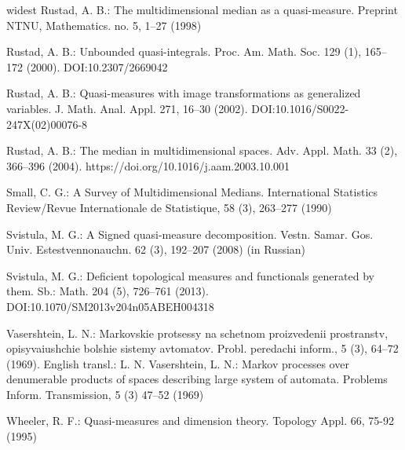 \documentclass[sn-mathphys-num]{sn-jnl}%
\theoremstyle{thmstyleone}%
\theoremstyle{definition}
\begin{document}
\begin{thebibliography}{widest}
 Rustad, A. B.: The multidimensional median as a quasi-measure. Preprint NTNU, Mathematics. no. 5, 1--27 (1998)

 Rustad, A. B.: Unbounded quasi-integrals. Proc. Am. Math. Soc. 129 (1), 165--172 (2000). DOI:10.2307/2669042   

 Rustad, A. B.:  Quasi-measures with image transformations as generalized variables. J. Math. Anal. Appl. 271, 16--30 (2002). 
 DOI:10.1016/S0022-247X(02)00076-8 

  Rustad, A. B.:  The median in multidimensional spaces. Adv.  Appl. Math. 33 (2), 366--396 (2004). https://doi.org/10.1016/j.aam.2003.10.001
       
Small,  C. G.:  A Survey of Multidimensional Medians. International Statistics Review/Revue Internationale de Statistique,  58 (3), 263--277 (1990)

 Svistula, M. G.:   A Signed quasi-measure decomposition.
Vestn. Samar. Gos. Univ. Estestvennonauchn. 62 (3), 192--207 (2008) (in Russian)

 Svistula, M. G.: Deficient topological measures and functionals generated by them. Sb.: Math. 204 (5), 726--761 (2013). 
 DOI:10.1070/SM2013v204n05ABEH004318

 Vasershtein, L. N.:  Markovskie protsessy na schetnom proizvedenii prostranstv, opisyvaiushchie bolshie sistemy avtomatov. Probl. peredachi inform., 
 5 (3), 64--72 (1969).  English transl.:  L. N. Vasershtein,  L. N.:  Markov processes over denumerable
products of spaces describing large system of automata. Problems Inform.
Transmission,  5 (3)  47--52 (1969)

 Wheeler, R. F.:  Quasi-measures and dimension theory.
  Topology Appl. 66, 75-92 (1995)

  
\end{thebibliography}
\end{document}
